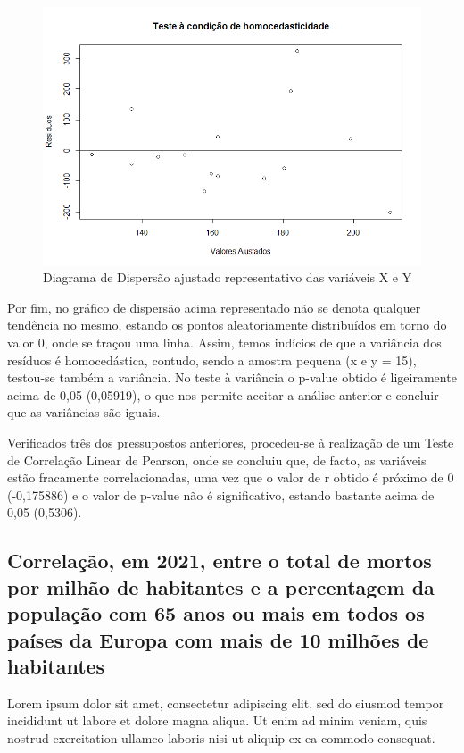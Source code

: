 \documentclass[conference]{IEEEtran}
\begin{document}
\begin{figure}[htbp]
\centerline{\includegraphics[width=0.95\columnwidth]{images/03.a.4.png}}
\caption{Diagrama de Dispersão ajustado representativo das variáveis X e Y}
\label{fig}
\end{figure}

Por fim, no gráfico de dispersão acima representado não se denota qualquer tendência no mesmo, estando os pontos aleatoriamente distribuídos em torno do valor 0, onde se traçou uma linha. Assim, temos indícios de que a variância dos resíduos é homocedástica, contudo, sendo a amostra pequena (x e y = 15), testou-se também a variância. No teste à variância o p-value obtido é ligeiramente acima de 0,05 (0,05919), o que nos permite aceitar a análise anterior e concluir que as variâncias são iguais.

Verificados três dos pressupostos anteriores, procedeu-se à realização de um Teste de Correlação Linear de Pearson, onde se concluiu que, de facto, as variáveis estão fracamente correlacionadas, uma vez que o valor de r obtido é próximo de 0 (-0,175886) e o valor de p-value não é significativo, estando bastante acima de 0,05 (0,5306).

\subsection{Correlação, em 2021, entre o total de mortos por milhão de habitantes e a percentagem da população com 65 anos ou mais em todos os países da Europa com mais de 10 milhões de habitantes}
Lorem ipsum dolor sit amet, consectetur adipiscing elit, sed do eiusmod tempor incididunt ut labore et dolore magna aliqua. Ut enim ad minim veniam, quis nostrud exercitation ullamco laboris nisi ut aliquip ex ea commodo consequat.
\end{document}
